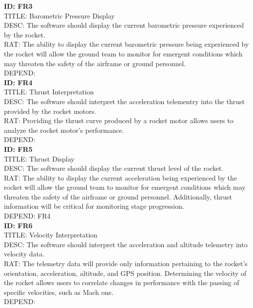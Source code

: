 \documentclass[onecolumn, draftclsnofoot,10pt, compsoc]{IEEEtran}
\begin{document}
			\noindent
			\textbf{ID: FR3}\\
			TITLE: Barometric Pressure Display\\
			DESC: The software should display the current barometric pressure experienced by the rocket.\\
			RAT: The ability to display the current barometric pressure being experienced by the rocket will allow the ground team to monitor for emergent conditions which may threaten the safety of the airframe or ground personnel.\\
			DEPEND: \\
			
			\noindent
			\textbf{ID: FR4}\\
			TITLE: Thrust Interpretation\\
			DESC: The software should interpret the acceleration telementry into the thrust provided by the rocket motors.\\
			RAT: Providing the thrust curve produced by a rocket motor allows users to analyze the rocket motor's performance.\\
			DEPEND: \\
			
			\noindent
			\textbf{ID: FR5}\\
			TITLE: Thrust Display\\
			DESC: The software should display the current thrust level of the rocket.\\
			RAT: The ability to display the current acceleration being experienced by the rocket will allow the ground team to monitor for emergent conditions which may threaten the safety of the airframe or ground personnel.
				Additionally, thrust information will be critical for monitoring stage progression.\\
			DEPEND: FR4\\
			
			\noindent
			\textbf{ID: FR6}\\
			TITLE: Velocity Interpretation\\
			DESC: The software should interpret the acceleration and altitude telemetry into velocity data.\\
			RAT: The telemetry data will provide only information pertaining to the rocket's orientation, acceleration, altitude, and GPS position.
				Determining the velocity of the rocket allows users to correlate changes in performance with the passing of specific velocities, such as Mach one.\\
			DEPEND: \\
			
\end{document}
